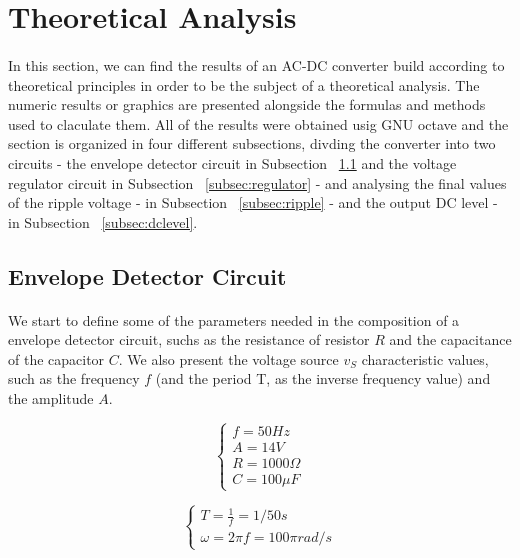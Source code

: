 \section{Theoretical Analysis}
\label{sec:analysis}

\paragraph{}
In this section, we can find the results of an AC-DC converter build according to theoretical principles in order to be the subject of a theoretical analysis. The numeric results or graphics are presented alongside the formulas and methods used to claculate them. All of the results were obtained usig GNU octave and the section is organized in four different subsections, divding the converter into two circuits - the envelope detector circuit in Subsection ~\ref{subsec:envelope} and the voltage regulator circuit in Subsection ~\ref{subsec:regulator} - and analysing the final values of the ripple voltage - in Subsection ~\ref{subsec:ripple} - and the output DC level - in Subsection ~\ref{subsec:dclevel}.



\subsection{Envelope Detector Circuit}
\label{subsec:envelope}

\paragraph{}
We start to define some of the parameters needed in the composition of a envelope detector circuit, suchs as the resistance of resistor $R$ and the capacitance of the capacitor $C$. We also present the voltage source $v_S$ characteristic values, such as the frequency $f$ (and the period T, as the inverse frequency value) and the amplitude $A$.

\[
\left\{\begin{matrix}
f = 50 Hz\\
A= 14 V\\
R= 1000 \Omega\\
C=100 \mu F
\end{matrix}\right.
\]

\[
\left\{\begin{matrix}
T = \frac{1}{f} = 1/50 s\\
\omega = 2 \pi f = 100 \pi rad/s
\end{matrix}\right.
\]

